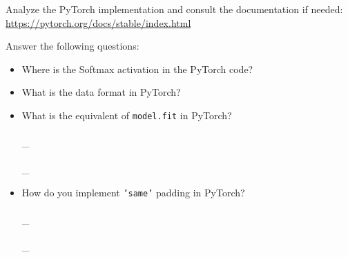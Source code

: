 \documentclass[parskip=half,notes,cadrem,toolver]{iisvlsi}
\begin{document}
\begin{studtask}
Analyze the PyTorch implementation and consult the documentation if needed: \url{https://pytorch.org/docs/stable/index.html} 

Answer the following questions:
\begin{itemize}
    \item Where is the Softmax activation in the PyTorch code? \answerrule
    \item What is the data format in PyTorch? \answerrule
    \item What is the equivalent of \texttt{model.fit} in PyTorch? \answerrule\\ \\ \_\answerrule\\ \\ \_\answerrule
    \item How do you implement \texttt{'same'} padding in PyTorch?
    \answerrule\\ \\ \_\answerrule\\ \\ \_\answerrule
    
\end{itemize}
\end{studtask}

\end{document}
